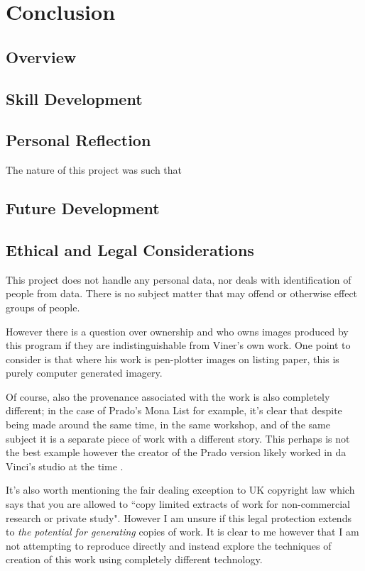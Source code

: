 \chapter{Conclusion}
\section{Overview}
\section{Skill Development}
\section{Personal Reflection}
The nature of this project was such that

\section{Future Development}

\section{Ethical and Legal Considerations}
This project does not handle any personal data, nor deals with identification of
people from data. There is no subject matter that may offend or otherwise effect
groups of people. 

However there is a question over ownership and who owns images produced by this
program if they are indistinguishable from Viner's own work.  One point to
consider is that where his work is pen-plotter images on listing paper, this is
purely computer generated imagery. 

Of course, also the provenance associated with the work is also completely
different; in the case of Prado's Mona List for example, it's clear that despite
being made around the same time, in the same workshop, and of the same subject
it is a separate piece of work with a different story. This perhaps is not the
best example however the creator of the Prado version likely worked in da
Vinci's studio at the time \citep{museodelprado_MonaLisa}. 

It's also worth mentioning the fair dealing exception to UK copyright law which
says that you are allowed to ``copy limited extracts of work for non-commercial
research or private study"\citep{govuk_copyright}. However I am unsure if this
legal protection extends to \emph{the potential for generating} copies of work.
It is clear to me however that I am not attempting to reproduce directly and
instead explore the techniques of creation of this work using completely
different technology.
